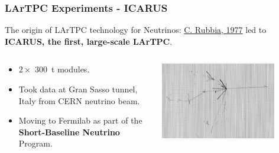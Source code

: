 \documentclass[xcolor=dvipsnames]{beamer}
\begin{document}
\begin{frame}
  \frametitle{LArTPC Experiments - ICARUS}

  The origin of LArTPC technology for Neutrinos: \href{http://cds.cern.ch/record/117852/files/CERN-EP-INT-77-8.pdf}{C. Rubbia, 1977} led to \textbf{ICARUS, the first, large-scale LArTPC}.

  \begin{columns}
    \begin{column}{0.5\textwidth}
      \begin{itemize}
      \item $2\times$ \SI{300}{\tonne} modules.
      \item Took data at Gran Sasso tunnel, Italy from CERN neutrino beam.
      \item Moving to Fermilab as part of the \textbf{Short-Baseline
        Neutrino} Program.
      \end{itemize}
    \end{column}
    \begin{column}{0.5\textwidth}
      \includegraphics[width=0.8\textwidth]{icarus.png}
    \end{column}
  \end{columns}
\end{frame}
\end{document}
